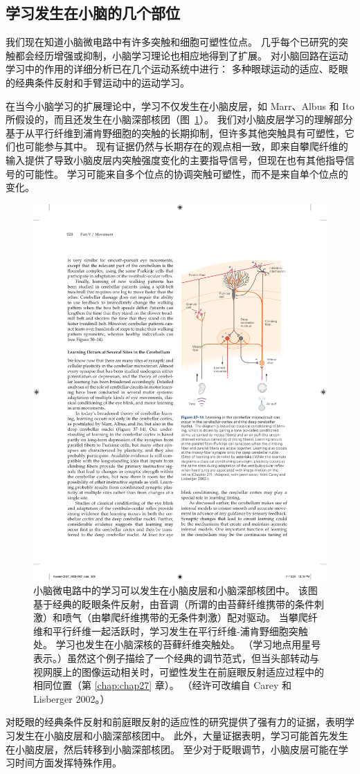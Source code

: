 \subsection{学习发生在小脑的几个部位}

我们现在知道小脑微电路中有许多突触和细胞可塑性位点。
几乎每个已研究的突触都会经历增强或抑制，小脑学习理论也相应地得到了扩展。
对小脑回路在运动学习中的作用的详细分析已在几个运动系统中进行：
多种眼球运动的适应、眨眼的经典条件反射和手臂运动中的运动学习。


在当今小脑学习的扩展理论中，学习不仅发生在小脑皮层，如 Marr、Albus 和 Ito 所假设的，而且还发生在小脑深部核团（图~\ref{fig:37_14}）。
我们对小脑皮层学习的理解部分基于从平行纤维到浦肯野细胞的突触的长期抑制，但许多其他突触具有可塑性，它们也可能参与其中。
现有证据仍然与长期存在的观点相一致，即来自攀爬纤维的输入提供了导致小脑皮层内突触强度变化的主要指导信号，但现在也有其他指导信号的可能性。
学习可能来自多个位点的协调突触可塑性，而不是来自单个位点的变化。


\begin{figure}[htbp]
	\centering
	\includegraphics[width=0.5\linewidth]{chap37/fig_37_14}
	\caption{小脑微电路中的学习可以发生在小脑皮层和小脑深部核团中。 该图基于经典的眨眼条件反射，由音调（所谓的由苔藓纤维携带的条件刺激）和喷气（由攀爬纤维携带的无条件刺激）配对驱动。 当攀爬纤维和平行纤维一起活跃时，学习发生在平行纤维-浦肯野细胞突触处。 学习也发生在小脑深核的苔藓纤维突触处。 （学习地点用星号表示。）虽然这个例子描绘了一个经典的调节范式，但当头部转动与视网膜上的图像运动相关时，可塑性发生在前庭眼反射适应过程中的相同位置（第 \ref{chap:chap27} 章）。 （经许可改编自 Carey 和 Lisberger 2002。）}
	\label{fig:37_14}
\end{figure}


对眨眼的经典条件反射和前庭眼反射的适应性的研究提供了强有力的证据，表明学习发生在小脑皮层和小脑深部核团中。
此外，大量证据表明，学习可能首先发生在小脑皮层，然后转移到小脑深部核团。
至少对于眨眼调节，小脑皮层可能在学习时间方面发挥特殊作用。


